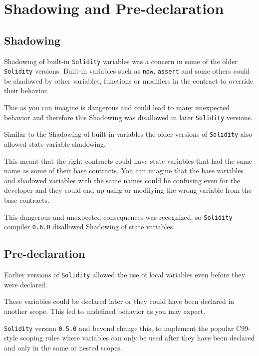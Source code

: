 \section{Shadowing and
Pre-declaration}\label{shadowing-and-pre-declaration}

\subsection{Shadowing}\label{shadowing}

Shadowing of built-in \texttt{Solidity} variables was a concern in some
of the older \texttt{Solidity} versions. Built-in variables such as
\texttt{now}, \texttt{assert} and some others could be shadowed by other
variables, functions or modifiers in the contract to override their
behavior.

This as you can imagine is dangerous and could lead to many unexpected
behavior and therefore this Shadowing was disallowed in later
\texttt{Solidity} versions.

Similar to the Shadowing of built-in variables the older versions of
\texttt{Solidity} also allowed state variable shadowing.

This meant that the right contracts could have state variables that had
the same name as some of their base contracts. You can imagine that the
base variables and shadowed variables with the same names could be
confusing even for the developer and they could end up using or
modifying the wrong variable from the base contracts.

This dangerous and unexpected consequences was recognized, so
\texttt{Solidity} compiler \texttt{0.6.0} disallowed Shadowing of state
variables.

\subsection{Pre-declaration}\label{pre-declaration}

Earlier versions of \texttt{Solidity} allowed the use of local variables
even before they were declared.

These variables could be declared later or they could have been declared
in another scope. This led to undefined behavior as you may expect.

\texttt{Solidity} version \texttt{0.5.0} and beyond change this, to
implement the popular C99-style scoping rules where variables can only
be used after they have been declared and only in the same or nested
scopes.
